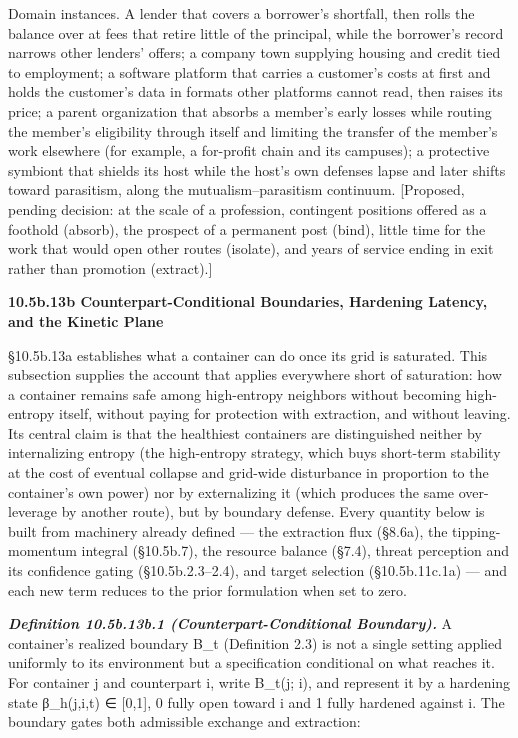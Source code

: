 \documentclass[
]{article}
\begin{document}
Domain instances. A lender that covers a borrower's shortfall, then
rolls the balance over at fees that retire little of the principal,
while the borrower's record narrows other lenders' offers; a company
town supplying housing and credit tied to employment; a software
platform that carries a customer's costs at first and holds the
customer's data in formats other platforms cannot read, then raises its
price; a parent organization that absorbs a member's early losses while
routing the member's eligibility through itself and limiting the
transfer of the member's work elsewhere (for example, a for-profit chain
and its campuses); a protective symbiont that shields its host while the
host's own defenses lapse and later shifts toward parasitism, along the
mutualism--parasitism continuum. {[}Proposed, pending decision: at the
scale of a profession, contingent positions offered as a foothold
(absorb), the prospect of a permanent post (bind), little time for the
work that would open other routes (isolate), and years of service ending
in exit rather than promotion (extract).{]}

\textbf{10.5b.13b Counterpart-Conditional Boundaries, Hardening Latency,
and the Kinetic Plane}

§10.5b.13a establishes what a container can do once its grid is
saturated. This subsection supplies the account that applies everywhere
short of saturation: how a container remains safe among high-entropy
neighbors without becoming high-entropy itself, without paying for
protection with extraction, and without leaving. Its central claim is
that the healthiest containers are distinguished neither by
internalizing entropy (the high-entropy strategy, which buys short-term
stability at the cost of eventual collapse and grid-wide disturbance in
proportion to the container's own power) nor by externalizing it (which
produces the same over-leverage by another route), but by boundary
defense. Every quantity below is built from machinery already defined
--- the extraction flux (§8.6a), the tipping-momentum integral
(§10.5b.7), the resource balance (§7.4), threat perception and its
confidence gating (§10.5b.2.3--2.4), and target selection
(§10.5b.11c.1a) --- and each new term reduces to the prior formulation
when set to zero.

\emph{\textbf{Definition 10.5b.13b.1 (Counterpart-Conditional
Boundary).}} A container's realized boundary B\_t (Definition 2.3) is
not a single setting applied uniformly to its environment but a
specification conditional on what reaches it. For container j and
counterpart i, write B\_t(j; i), and represent it by a hardening state
β\_h(j,i,t) ∈ {[}0,1{]}, 0 fully open toward i and 1 fully hardened
against i. The boundary gates both admissible exchange and extraction:
\end{document}
